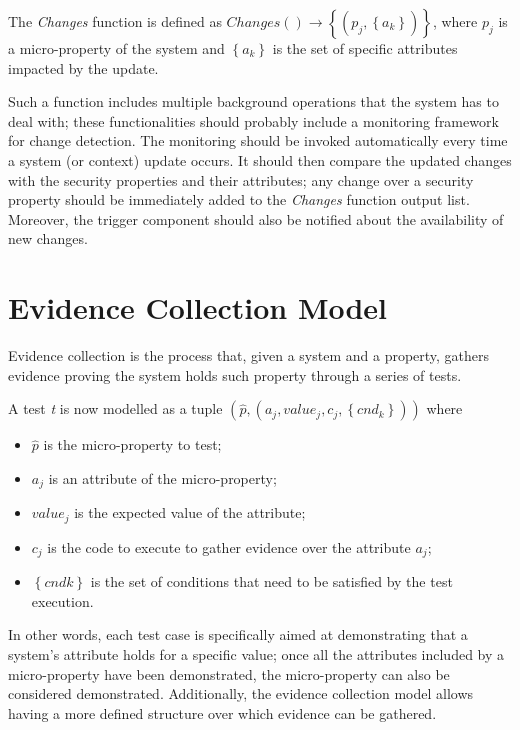 \begin{defn}
The \textit{Changes} function is defined as \(Changes() \rightarrow \left \{ \left ( p_j, \left \{ a_k \right \} \right ) \right \} \), where \(p_j\) is a micro-property of the system and \( \left \{a_k \right \} \) is the set of specific attributes impacted by the update.
\end{defn}

Such a function includes multiple background operations that the system has to deal with; these functionalities should probably include a monitoring framework for change detection. The monitoring should be invoked automatically every time a system (or context) update occurs. It should then compare the updated changes with the security properties and their attributes; any change over a security property should be immediately added to the \textit{Changes} function output list. Moreover, the trigger component should also be notified about the availability of new changes.


\section{Evidence Collection Model}

Evidence collection is the process that, given a system and a property, gathers evidence proving the system holds such property through a series of tests.

\begin{defn}
    A test \textit{t} is now modelled as a tuple \( \left ( \hat{p}, \left (a_j, value_j, c_j, \left \{ cnd_k \right \} \right ) \right ) \) where
    \begin{itemize}
        \item \( \hat{p} \) is the micro-property to test;
        \item \(a_j\) is an attribute of the micro-property;
        \item \(value_j\) is the expected value of the attribute;
        \item \(c_j\) is the code to execute to gather evidence over the attribute \(a_j\);
        \item \( \left \{ cndk \right \} \) is the set of conditions that need to be satisfied by the test execution.
    \end{itemize}
\end{defn}

In other words, each test case is specifically aimed at demonstrating that a system's attribute holds for a specific value; once all the attributes included by a micro-property have been demonstrated, the micro-property can also be considered demonstrated.
Additionally, the evidence collection model allows having a more defined structure over
which evidence can be gathered.

